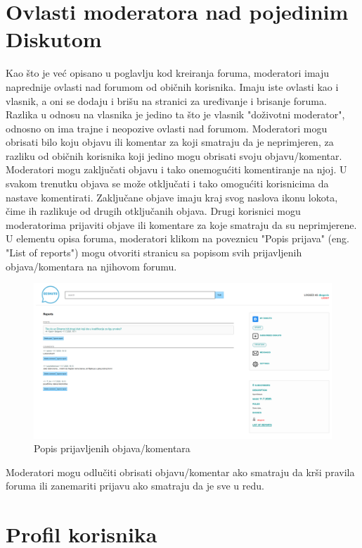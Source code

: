\documentclass{foi}
\begin{document}
\section{Ovlasti moderatora nad pojedinim Diskutom}

Kao što je već opisano u poglavlju kod kreiranja foruma, moderatori imaju naprednije ovlasti nad forumom od običnih korisnika. Imaju iste ovlasti kao i vlasnik, a oni se dodaju i brišu na stranici za uređivanje i brisanje foruma. Razlika u odnosu na vlasnika je jedino ta što je vlasnik "doživotni moderator", odnosno on ima trajne i neopozive ovlasti nad forumom. Moderatori mogu obrisati bilo koju objavu ili komentar za koji smatraju da je neprimjeren, za razliku od običnih korisnika koji jedino mogu obrisati svoju objavu/komentar. Moderatori mogu zaključati objavu i tako onemogućiti komentiranje na njoj. U svakom trenutku objava se može otključati i tako omogućiti korisnicima da nastave komentirati. Zaključane objave imaju kraj svog naslova ikonu lokota, čime ih razlikuje od drugih otključanih objava. Drugi korisnici mogu moderatorima prijaviti objave ili komentare za koje smatraju da su neprimjerene. U elementu opisa foruma, moderatori klikom na poveznicu "Popis prijava" (eng. "List of reports") mogu otvoriti stranicu sa popisom svih prijavljenih objava/komentara na njihovom forumu.

\begin{figure}[h!]
    \centering
    \includegraphics[width=1\textwidth]{slike/prijave.png}
    \caption{Popis prijavljenih objava/komentara}
\end{figure}

Moderatori mogu odlučiti obrisati objavu/komentar ako smatraju da krši pravila foruma ili zanemariti prijavu ako smatraju da je sve u redu.

\section{Profil korisnika}
\end{document}
